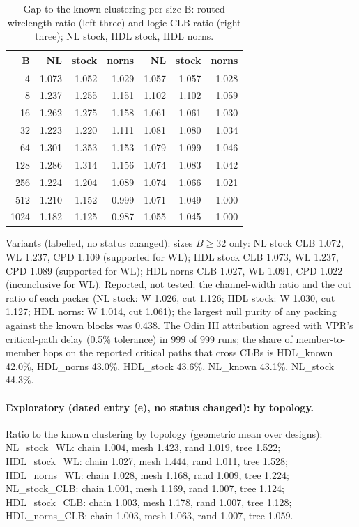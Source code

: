 \begin{table}[t]
\caption{Gap to the known clustering per size B: routed wirelength ratio (left three) and logic CLB ratio (right three); NL stock, HDL stock, HDL norns.}
\label{tab:r5gap}
\centering\scriptsize
\begin{tabular}{@{}rrrr@{\hspace{6pt}}rrr@{}}
\toprule
B & NL & stock & norns & NL & stock & norns \\
\midrule
4 & 1.073 & 1.052 & 1.029 & 1.057 & 1.057 & 1.028 \\
8 & 1.237 & 1.255 & 1.151 & 1.102 & 1.102 & 1.059 \\
16 & 1.262 & 1.275 & 1.158 & 1.061 & 1.061 & 1.030 \\
32 & 1.223 & 1.220 & 1.111 & 1.081 & 1.080 & 1.034 \\
64 & 1.301 & 1.353 & 1.153 & 1.079 & 1.099 & 1.046 \\
128 & 1.286 & 1.314 & 1.156 & 1.074 & 1.083 & 1.042 \\
256 & 1.224 & 1.204 & 1.089 & 1.074 & 1.066 & 1.021 \\
512 & 1.210 & 1.152 & 0.999 & 1.071 & 1.049 & 1.000 \\
1024 & 1.182 & 1.125 & 0.987 & 1.055 & 1.045 & 1.000 \\
\bottomrule
\end{tabular}
\end{table}
Variants (labelled, no status changed): sizes $B\ge32$ only: NL stock CLB 1.072, WL 1.237, CPD 1.109 (supported for WL); HDL stock CLB 1.073, WL 1.237, CPD 1.089 (supported for WL); HDL norns CLB 1.027, WL 1.091, CPD 1.022 (inconclusive for WL). Reported, not tested: the channel-width ratio and the cut ratio of each packer (NL stock: W 1.026, cut 1.126; HDL stock: W 1.030, cut 1.127; HDL norns: W 1.014, cut 1.061); the largest null purity of any packing against the known blocks was 0.438. The Odin III attribution agreed with VPR's critical-path delay (0.5\% tolerance) in 999 of 999 runs; the share of member-to-member hops on the reported critical paths that cross CLBs is HDL\_known 42.0\%, HDL\_norns 43.0\%, HDL\_stock 43.6\%, NL\_known 43.1\%, NL\_stock 44.3\%.
\paragraph{Exploratory (dated entry (e), no status changed): by topology.} Ratio to the known clustering by topology (geometric mean over designs): NL\_stock\_WL: chain 1.004, mesh 1.423, rand 1.019, tree 1.522; HDL\_stock\_WL: chain 1.027, mesh 1.444, rand 1.011, tree 1.528; HDL\_norns\_WL: chain 1.028, mesh 1.168, rand 1.009, tree 1.224; NL\_stock\_CLB: chain 1.001, mesh 1.169, rand 1.007, tree 1.124; HDL\_stock\_CLB: chain 1.003, mesh 1.178, rand 1.007, tree 1.128; HDL\_norns\_CLB: chain 1.003, mesh 1.063, rand 1.007, tree 1.059.
